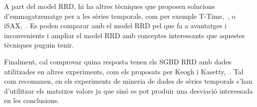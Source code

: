 A part del model RRD, hi ha altres tècniques que proposen solucions d'emmagatzematge per a les sèries temporals, com per exemple T-Time,~\cite{assfalg08:ttime}, o iSAX,~\cite{isax}. Es poden comparar amb el model RRD pel que fa a avantatges i inconvenients i ampliar el model RRD amb conceptes interessants que aquestes tècniques puguin tenir.

Finalment, cal comprovar quina resposta tenen els SGBD RRD amb dades utilitzades en altres experiments, com els proposats per Keogh i Kasetty,~\cite{keogh02}. Tal com recomanen, en els experiments de mineria de dades de sèries temporals s'han d'utilitzar els mateixos valors ja que sinó es pot produir una desviació interessada en les conclusions.





